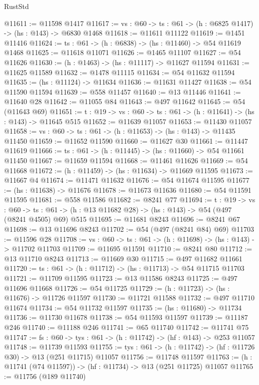 \begin{lexlean}{RustStd}
\begin{coremodule}
@11611 := @11598 @1417
@11617 := {vs : @60} -> {ts : @61} -> (h : @6825 @1417) -> (hs : @143) -> @6830 @1468
@11618 := @11611 @11122
@11619 := @1451 @11416
@11624 := {ts : @61} -> (h : @6838) -> (hs : @11460) -> @54 @11619 @1468
@11625 := @11618 @11071
@11626 := @1465 @11107
@11627 := @54 @11626
@11630 := (h : @1463) -> (hs : @11117) -> @11627 @11594
@11631 := @11625 @11589
@11632 := @1478 @11115
@11634 := @54 @11632 @11594
@11635 := (hs : @11124) -> @11634
@11636 := @11631 @11427
@11638 := @54 @11590 @11594
@11639 := @558 @11457
@11640 := @13 @11446
@11641 := @11640 @28
@11642 := @11055 @84
@11643 := @497 @11642
@11645 := @54 (@11643 @69)
@11651 := {t : @19} -> {vs : @60} -> {ts : @61} -> (h : @11641) -> (hs : @143) -> @11645 @515
@11652 := @11639 @11057
@11653 := @11430 @11057
@11658 := {vs : @60} -> {ts : @61} -> (h : @11653) -> (hs : @143) -> @11435 @11450
@11659 := @11652 @11590
@11660 := @11627 @30
@11661 := @11447 @11619
@11666 := {ts : @61} -> (h : @11445) -> (hs : @11660) -> @54 @11661 @11450
@11667 := @11659 @11594
@11668 := @11461 @11626
@11669 := @54 @11668
@11672 := (h : @11459) -> (hs : @11634) -> @11669 @11595
@11673 := @11667 @4
@11674 := @11471 @11632
@11676 := @54 @11674 @11595
@11677 := (hs : @11638) -> @11676
@11678 := @11673 @11636
@11680 := @54 @11591 @11595
@11681 := @558 @11586
@11682 := @8241 @77
@11694 := {t : @19} ->
  {vs : @60} ->
  {ts : @61} -> (h : @13 @11682 @28) -> (hs : @143) -> @54 (@497 (@8241 @4505) @69) @515
@11695 := @11681 @8243
@11696 := @8241 @67
@11698 := @13 @11696 @8243
@11702 := @54 (@497 (@8241 @84) @69)
@11703 := @11596 @28
@11708 := {vs : @60} -> {ts : @61} -> (h : @11698) -> (hs : @143) -> @11702 @11703
@11709 := @11695 @11591
@11710 := @8241 @80
@11712 := @13 @11710 @8243
@11713 := @11669 @30
@11715 := @497 @11682 @11661
@11720 := {ts : @61} -> (h : @11712) -> (hs : @11713) -> @54 @11715 @11703
@11721 := @11709 @11595
@11723 := @13 @11586 @8243
@11725 := @497 @11696 @11668
@11726 := @54 @11725
@11729 := (h : @11723) -> (hs : @11676) -> @11726 @11597
@11730 := @11721 @11588
@11732 := @497 @11710 @11674
@11734 := @54 @11732 @11597
@11735 := (hs : @11680) -> @11734
@11736 := @11730 @11678
@11738 := @54 @11593 @11597
@11739 := @11187 @246
@11740 := @11188 @246
@11741 := @65 @11740
@11742 := @11741 @75
@11747 := {fs : @60} -> {tys : @61} -> (h : @11742) -> (hf : @143) -> @253 @11057
@11748 := @11739 @11593
@11755 := {tys : @61} -> (h : @11742) -> (hf : @11726 @30) -> @13 (@251 @11715) @11057
@11756 := @11748 @11597
@11763 := (h : @11741 (@74 @11597)) -> (hf : @11734) -> @13 (@251 @11725) @11057
@11765 := @11756 (@189 @11740)

\end{coremodule}
\end{lexlean}
